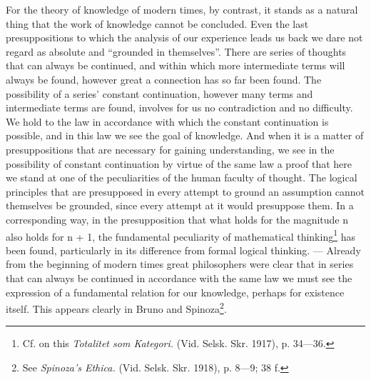 \documentclass[12pt,a4paper,openany]{book}
\newcommand{\opage}[1]{\marginnote{\footnotesize\textit{[#1]}}}
\begin{document}
For the theory of knowledge of modern times, by contrast, it stands as a natural thing that the work of knowledge cannot be concluded.
Even the last presuppositions to which the analysis
of our experience leads us back we dare not regard as
absolute and ``grounded in themselves''. There are series of thoughts
that can always be continued, and within which more intermediate terms
will always be found, however great a connection
has so far been found. The possibility of a series' constant
continuation, however many terms and intermediate terms are found,
involves for us no contradiction and no difficulty.
We hold to the law in accordance with which the constant continuation
is possible, and in this law we see the goal of knowledge.
And when it is a matter of presuppositions that are necessary
for gaining understanding, we see in the possibility of constant
\setcounter{footnote}{0}%
\opage{18}continuation by virtue of the same law a proof that here we
stand at one of the peculiarities of the human faculty of thought.
The logical principles that are presupposed in
every attempt to ground an assumption cannot themselves be
grounded, since every attempt at it would presuppose them.
In a corresponding way, in the presupposition that
what holds for the magnitude n also holds for n + 1,
the fundamental peculiarity of mathematical
thinking\footnote[1]{Cf. on this \textit{Totalitet som Kategori.} (Vid. Selsk. Skr. 1917), p. 34---36.} has been found, particularly in its difference from formal logical thinking.
--- Already from the beginning of modern times great philosophers were
clear that in series that can always be continued
in accordance with the same law we must see the expression of a fundamental relation for
our knowledge, perhaps for existence itself. This appears
clearly in Bruno and Spinoza\footnote[2]{See \textit{Spinoza’s Ethica.} (Vid. Selsk. Skr. 1918), p. 8---9; 38 f.}.
\end{document}
